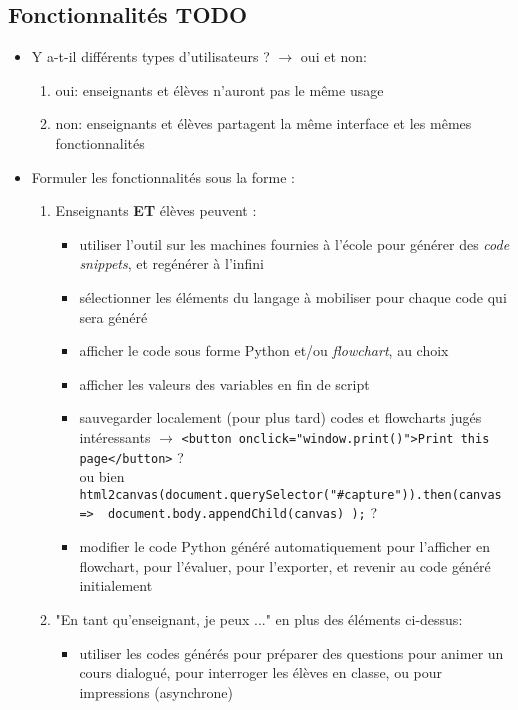 \documentclass[11pt,a4paper]{article}
\begin{document}
\subsection{Fonctionnalités TODO}

\begin{itemize}
    \item Y a-t-il différents types d'utilisateurs ? $\longrightarrow$ oui et non: 
    \begin{enumerate}
        \item oui: enseignants et élèves n'auront pas le même usage
        \item non: enseignants et élèves partagent la même interface et les mêmes fonctionnalités
    \end{enumerate}
    \item Formuler les fonctionnalités sous la forme : 
    \begin{enumerate}
        \item Enseignants \textbf{ET} élèves peuvent :
        \begin{itemize}
            \item utiliser l'outil sur les machines fournies à l'école pour générer des \textit{code snippets}, et regénérer à l'infini
            \item sélectionner les éléments du langage à mobiliser pour chaque code qui sera généré
            \item afficher le code sous forme Python et/ou \textit{flowchart}, au choix
            \item afficher les valeurs des variables en fin de script
            \item sauvegarder localement (pour plus tard) codes et flowcharts jugés intéressants $\longrightarrow$ \texttt{<button onclick="window.print()">Print this page</button>} ?\\ 
            ou bien \texttt{html2canvas(document.querySelector("\#capture")).then(canvas => { document.body.appendChild(canvas) });} ?
            \item modifier le code Python généré automatiquement pour l'afficher en flowchart, pour l'évaluer, pour l'exporter, et revenir au code généré initialement
        \end{itemize}
        \item "En tant qu'enseignant, je peux ..." en plus des éléments ci-dessus:
        \begin{itemize}
            \item utiliser les codes générés pour préparer des questions pour animer un cours dialogué, pour interroger les élèves en classe, ou pour impressions (asynchrone)

\end{itemize}
\end{enumerate}
\end{itemize}
\end{document}

